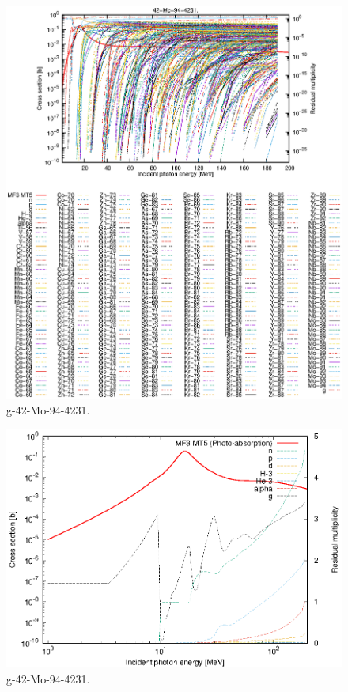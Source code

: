 \begin{figure}
 \includegraphics[width=\linewidth]{eps/g_42-Mo-94_4231.eps}
  \caption{g-42-Mo-94-4231.}
\end{figure}
\newpage \clearpage

\begin{figure}
 \includegraphics[width=\linewidth]{eps-log/g_42-Mo-94_4231.eps}
 \caption{g-42-Mo-94-4231.}
\end{figure}
\newpage \clearpage

